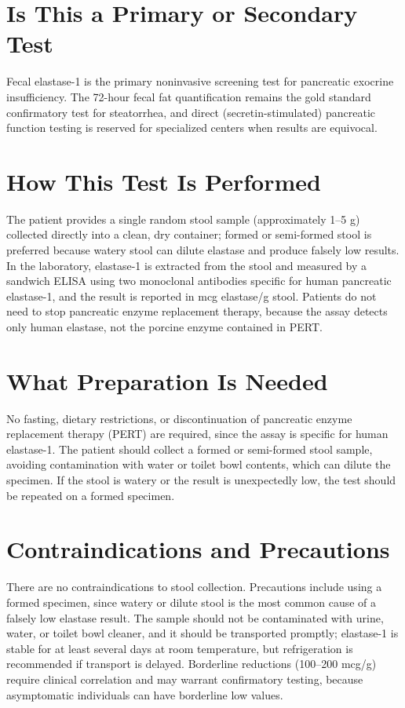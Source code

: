 \section*{Is This a Primary or Secondary Test}
Fecal elastase-1 is the primary noninvasive screening test for pancreatic exocrine insufficiency. The 72-hour fecal fat quantification remains the gold standard confirmatory test for steatorrhea, and direct (secretin-stimulated) pancreatic function testing is reserved for specialized centers when results are equivocal.
\section*{How This Test Is Performed}
The patient provides a single random stool sample (approximately 1--5 g) collected directly into a clean, dry container; formed or semi-formed stool is preferred because watery stool can dilute elastase and produce falsely low results. In the laboratory, elastase-1 is extracted from the stool and measured by a sandwich ELISA using two monoclonal antibodies specific for human pancreatic elastase-1, and the result is reported in mcg elastase/g stool. Patients do not need to stop pancreatic enzyme replacement therapy, because the assay detects only human elastase, not the porcine enzyme contained in PERT.
\section*{What Preparation Is Needed}
No fasting, dietary restrictions, or discontinuation of pancreatic enzyme replacement therapy (PERT) are required, since the assay is specific for human elastase-1. The patient should collect a formed or semi-formed stool sample, avoiding contamination with water or toilet bowl contents, which can dilute the specimen. If the stool is watery or the result is unexpectedly low, the test should be repeated on a formed specimen.
\section*{Contraindications and Precautions}
There are no contraindications to stool collection. Precautions include using a formed specimen, since watery or dilute stool is the most common cause of a falsely low elastase result. The sample should not be contaminated with urine, water, or toilet bowl cleaner, and it should be transported promptly; elastase-1 is stable for at least several days at room temperature, but refrigeration is recommended if transport is delayed. Borderline reductions (100--200 mcg/g) require clinical correlation and may warrant confirmatory testing, because asymptomatic individuals can have borderline low values.
